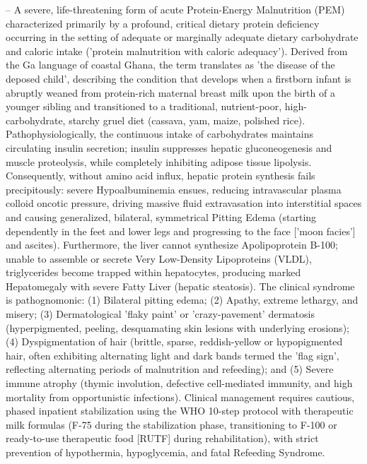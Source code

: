 -- A severe, life-threatening form of acute Protein-Energy Malnutrition (PEM) characterized primarily by a profound, critical dietary protein deficiency occurring in the setting of adequate or marginally adequate dietary carbohydrate and caloric intake ('protein malnutrition with caloric adequacy'). Derived from the Ga language of coastal Ghana, the term translates as 'the disease of the deposed child', describing the condition that develops when a firstborn infant is abruptly weaned from protein-rich maternal breast milk upon the birth of a younger sibling and transitioned to a traditional, nutrient-poor, high-carbohydrate, starchy gruel diet (cassava, yam, maize, polished rice). Pathophysiologically, the continuous intake of carbohydrates maintains circulating insulin secretion; insulin suppresses hepatic gluconeogenesis and muscle proteolysis, while completely inhibiting adipose tissue lipolysis. Consequently, without amino acid influx, hepatic protein synthesis fails precipitously: severe Hypoalbuminemia ensues, reducing intravascular plasma colloid oncotic pressure, driving massive fluid extravasation into interstitial spaces and causing generalized, bilateral, symmetrical Pitting Edema (starting dependently in the feet and lower legs and progressing to the face ['moon facies'] and ascites). Furthermore, the liver cannot synthesize Apolipoprotein B-100; unable to assemble or secrete Very Low-Density Lipoproteins (VLDL), triglycerides become trapped within hepatocytes, producing marked Hepatomegaly with severe Fatty Liver (hepatic steatosis). The clinical syndrome is pathognomonic: (1) Bilateral pitting edema; (2) Apathy, extreme lethargy, and misery; (3) Dermatological 'flaky paint' or 'crazy-pavement' dermatosis (hyperpigmented, peeling, desquamating skin lesions with underlying erosions); (4) Dyspigmentation of hair (brittle, sparse, reddish-yellow or hypopigmented hair, often exhibiting alternating light and dark bands termed the 'flag sign', reflecting alternating periods of malnutrition and refeeding); and (5) Severe immune atrophy (thymic involution, defective cell-mediated immunity, and high mortality from opportunistic infections). Clinical management requires cautious, phased inpatient stabilization using the WHO 10-step protocol with therapeutic milk formulas (F-75 during the stabilization phase, transitioning to F-100 or ready-to-use therapeutic food [RUTF] during rehabilitation), with strict prevention of hypothermia, hypoglycemia, and fatal Refeeding Syndrome.


